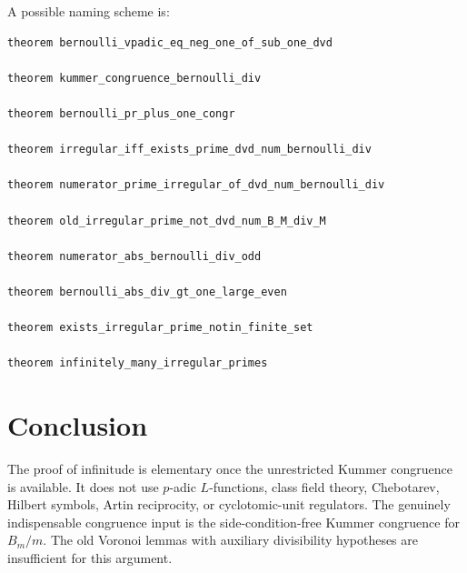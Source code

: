 \documentclass[11pt]{article}
\begin{document}
A possible naming scheme is:

\begin{verbatim}
theorem bernoulli_vpadic_eq_neg_one_of_sub_one_dvd

theorem kummer_congruence_bernoulli_div

theorem bernoulli_pr_plus_one_congr

theorem irregular_iff_exists_prime_dvd_num_bernoulli_div

theorem numerator_prime_irregular_of_dvd_num_bernoulli_div

theorem old_irregular_prime_not_dvd_num_B_M_div_M

theorem numerator_abs_bernoulli_div_odd

theorem bernoulli_abs_div_gt_one_large_even

theorem exists_irregular_prime_notin_finite_set

theorem infinitely_many_irregular_primes
\end{verbatim}

\section{Conclusion}

The proof of infinitude is elementary once the unrestricted Kummer congruence is available.  It does not use $p$-adic $L$-functions, class field theory, Chebotarev, Hilbert symbols, Artin reciprocity, or cyclotomic-unit regulators.  The genuinely indispensable congruence input is the side-condition-free Kummer congruence for $B_m/m$.  The old Voronoi lemmas with auxiliary divisibility hypotheses are insufficient for this argument.
\end{document}
